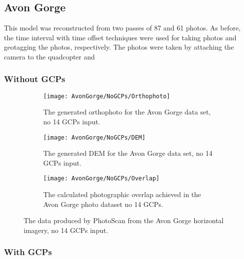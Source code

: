 \subsection{Avon Gorge}
\label{sec:results/avon-gorge}

This model was reconstructed from two passes of 87 and 61 photos. As before, the
time interval with time offset techniques were used for taking photos and
geotagging the photos, respectively. The photos were taken by attaching the
camera to the quadcopter and 

\subsubsection{Without GCPs}

\begin{figure}
    \centering
    \begin{subfigure}[b]{0.3\textwidth}
        \texttt{[image: AvonGorge/NoGCPs/Orthophoto]}
        \caption{The generated orthophoto for the Avon Gorge data set, no 14
        GCPs input.}
        \label{img:avon-gorge/no-gcps/orthophoto}
    \end{subfigure}
    \begin{subfigure}[b]{0.3\textwidth}
        \texttt{[image: AvonGorge/NoGCPs/DEM]}
        \caption{The generated DEM for the Avon Gorge data set, no 14 GCPs
        input.}
        \label{img:avon-gorge/no-gcps/dem}
    \end{subfigure}
    \begin{subfigure}[b]{0.3\textwidth}
        \texttt{[image: AvonGorge/NoGCPs/Overlap]}
        \caption{The calculated photographic overlap achieved in the Avon Gorge
        photo dataset no 14 GCPs.}
        \label{img:avon-gorge/no-gcps/overlap}
    \end{subfigure}
    \caption{The data produced by PhotoScan from the Avon Gorge horizontal
    imagery, no 14 GCPs input.}
    \label{img:avon-gorge/no-gcps}
\end{figure}

\subsubsection{With GCPs}

